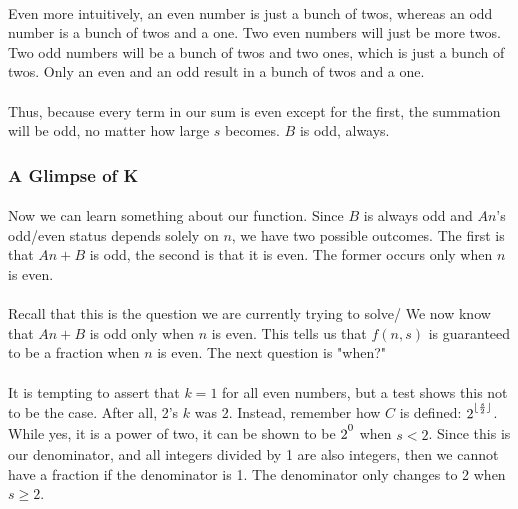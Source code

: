 \documentclass[12pt,letterpaper]{article}
\begin{document}
			\paragraph{} Even more intuitively, an even number is just a bunch of twos, whereas an odd number is a bunch of twos and a one. Two even numbers will just be more twos. Two odd numbers will be a bunch of twos and two ones, which is just a bunch of twos. Only an even and an odd result in a bunch of twos and a one.
			
			\paragraph{} Thus, because every term in our sum is even except for the first, the summation will be odd, no matter how large $s$ becomes. $B$ is odd, always.
			
		\subsubsection{A Glimpse of K}
		
			\paragraph{} Now we can learn something about our function. Since $B$ is always odd and $An$'s odd/even status depends solely on $n$, we have two possible outcomes. The first is that $An + B$ is odd, the second is that it is even. The former occurs only when $n$ is even.
			
			\paragraph{} Recall that this is the question we are currently trying to solve/ We now know that $An + B$ is odd only when $n$ is even. This tells us that $f(n, s)$ is guaranteed to be a fraction when $n$ is even. The next question is "when?"
			
			\paragraph{} It is tempting to assert that $k = 1$ for all even numbers, but a test shows this not to be the case. After all, 2's $k$ was 2. Instead, remember how $C$ is defined: $2\strut^{\lfloor \frac{s}{2} \rfloor}$. While yes, it is a power of two, it can be shown to be $2\strut^0$ when $s < 2$. Since this is our denominator, and all integers divided by 1 are also integers, then we cannot have a fraction if the denominator is 1. The denominator only changes to 2 when $s \geqslant 2$.
			
\end{document}
